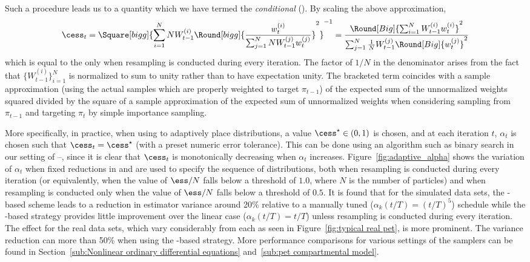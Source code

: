 Such a procedure leads us to a quantity which we have termed the \emph{conditional} \ess (\cess). By scaling the above approximation,
\begin{equation}
  \cess_t = \Square[bigg]{\sum_{i=1}^N N W_{t-1}^{(i)} \Round[bigg]{
        \frac{w_t^{(i)}}{\sum_{j=1}^N N W_{t-1}^{(j)}w_t^{(j)}}}^2}^{-1}
  = \frac{\Round[Big]{\sum_{i=1}^NW_{t-1}^{(i)}w_t^{(i)}}^2}
  {\sum_{j=1}^N \frac{1}{N} W_{t-1}^{(j)} \Round[Big]{w_t^{(j)}}^2}
\end{equation}
which is equal to the \ess only when resampling is conducted during every iteration. The factor of $1/N$ in the denominator arises from the fact that $\{W_{t-1}^{(i)}\}_{i=1}^N$ is normalized to sum to unity rather than to have expectation unity. The bracketed term coincides with a sample approximation (using the actual samples which are properly weighted to target $\pi_{t-1}$) of the expected sum of the unnormalized weights squared divided by the square of a sample approximation of the expected sum of unnormalized weights when considering sampling from $\pi_{t-1}$ and targeting $\pi_t$ by simple importance sampling.



More specifically, in practice, when using \cess to adaptively place distributions, a value $\cess^\star \in (0, 1)$ is chosen, and at each iteration $t$, $\alpha_t$ is chosen such that $\cess_t = \cess^\star$ (with a preset numeric error tolerance). This can be done using an algorithm such as binary search in our setting of \smc[1]--\smc[3], since it is clear that $\cess_t$ is monotonically decreasing when $\alpha_t$ increases. Figure~\ref{fig:adaptive_alpha} shows the variation of $\alpha_t$ when fixed reductions in \ess and \cess are used to specify the sequence of distributions, both when resampling is conducted during every iteration (or equivalently, when the value of $\ess/N$ falls below a threshold of $1.0$, where $N$ is the number of particles) and when resampling is conducted only when the value of $\ess/N$ falls below a threshold of $0.5$. It is found that for the simulated \pet data sets, the \cess-based scheme leads to a reduction in estimator variance around 20\% relative to a manually tuned ($\alpha_k(t/T) = (t/T)^5$) schedule while the \ess-based strategy provides little improvement over the linear case ($\alpha_k(t/T) = t/T$) unless resampling is conducted during every iteration. The effect for the real data sets, which vary considerably from each  as seen in Figure~\ref{fig:typical real pet}, is more prominent. The variance reduction can  more than 50\% when using the \cess-based strategy. More performance comparisons for various settings of the samplers can be found in Section~\ref{sub:Nonlinear ordinary differential equations} and~\ref{sub:pet compartmental model}.


